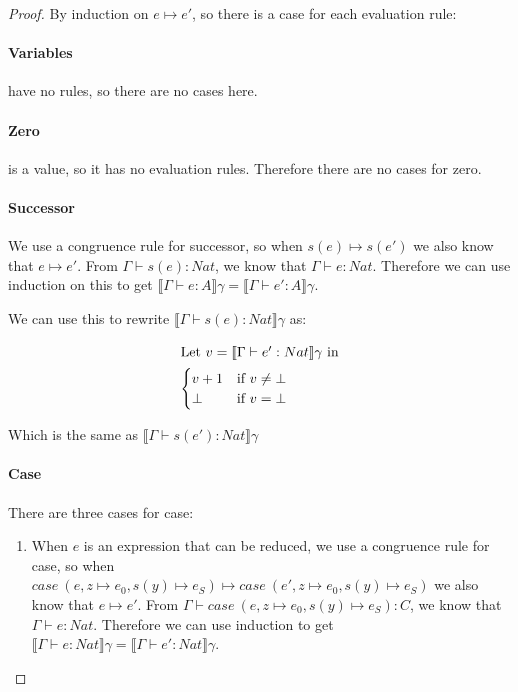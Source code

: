 \begin{proof}
By induction on $e \mapsto e'$, so there is a case for each evaluation rule:

\paragraph{Variables} have no rules, so there are no cases here.

\paragraph{Zero} is a value, so it has no evaluation rules. Therefore there are no cases for zero.

\paragraph{Successor} We use a congruence rule for successor, so when $s(e) \mapsto s(e')$ we also know that $e \mapsto e'$. From $\Gamma \vdash s(e) : Nat$, we know that $\Gamma \vdash e : Nat$. Therefore we can use induction on this to get $\llbracket \Gamma \vdash e : A \rrbracket \gamma =  \llbracket \Gamma \vdash e' : A \rrbracket \gamma$.

We can use this to rewrite $\llbracket \Gamma \vdash s(e) : Nat \rrbracket \gamma$ as:

\begin{minipage}{4in}
\begin{align*}
\intertext{Let $v = \llbracket \Gamma \vdash e' : Nat \rrbracket\gamma$ in}
  \begin{cases}
            v+1 & \text{if } v \neq \bot  \\
           \bot & \text{if } v = \bot
  \end{cases}
\end{align*} 
\end{minipage}

Which is the same as $\llbracket \Gamma \vdash s(e') : Nat \rrbracket \gamma$

\paragraph{Case} There are three cases for case:

\begin{enumerate}
\item{When $e$ is an expression that can be reduced, we  use a congruence rule for case, so when $case \ (e, z \mapsto e_0, s(y) \mapsto e_S)  \mapsto case \ (e', z \mapsto e_0, s(y) \mapsto e_S)$ we also know that $e \mapsto e'$. From $\Gamma \vdash case \ (e, z \mapsto e_0, s(y) \mapsto e_S) : C $, we know that $\Gamma \vdash e : Nat$. Therefore we can use induction to get $\llbracket \Gamma \vdash e : Nat \rrbracket \gamma =  \llbracket \Gamma \vdash e' : Nat \rrbracket \gamma$.

}
\end{enumerate}
\end{proof}
